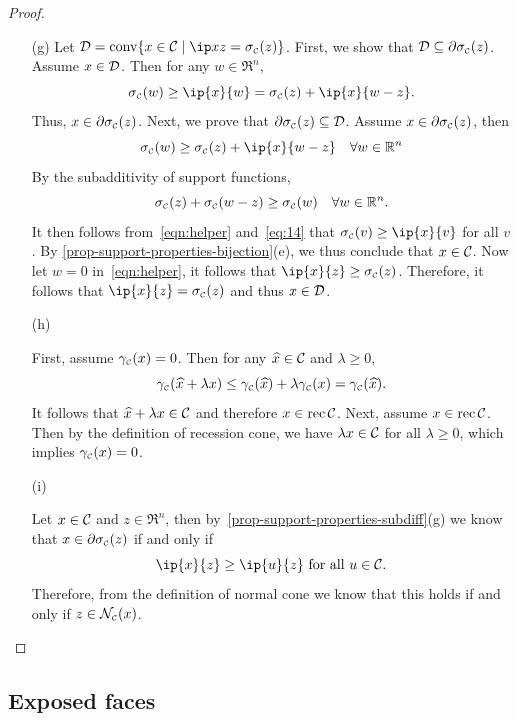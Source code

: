 \begin{proof}
\begin{itemize}
  \item[(g)] Let $\Dscr = \conv\{x\in\Cscr \mid \ip x z = \sigma\Cs(z)\}$. First, we
      show that $\mathcal{D} \subseteq \partial\sigma_{\scriptscriptstyle\mathcal{C}}(z)$. Assume $x \in \mathcal{D}$. Then
      for any $w \in \Re^n$,
    \[\sigma\Cs(w) \geq \ip{x}{w} = \sigma\Cs(z) + \ip{x}{w - z}.\]
    Thus, $x \in \partial\sigma_{\scriptscriptstyle\mathcal{C}}(z)$. Next, we prove that
    $\partial\sigma_{\scriptscriptstyle\mathcal{C}}(z) \subseteq \mathcal{D}$. Assume
    $x \in \partial\sigma_{\scriptscriptstyle\mathcal{C}}(z)$, then
    \begin{equation}\label{eqn:helper}
      \sigma\Cs(w) \geq \sigma\Cs(z) + \ip{x}{w - z} \quad \forall w \in \Re^n
    \end{equation}
    By the subadditivity of support functions,
    \begin{equation} \label{eq:14}
      \sigma_{\scriptscriptstyle\mathcal{C}}(z) + \sigma_{\scriptscriptstyle\mathcal{C}}(w - z) \geq \sigma_{\scriptscriptstyle\mathcal{C}}(w) \quad \forall w \in \mathbb{R}^n.
    \end{equation}
    It then follows from~\eqref{eqn:helper} and~\eqref{eq:14} that
    $\sigma\Cs(v) \geq \ip{x}{v}$ for all $v$.  By \autoref{prop-support-properties-bijection}(e), we thus
    conclude that $x \in \mathcal{C}$. Now let $w = 0$ in~\eqref{eqn:helper},
    it follows that $\ip{x}{z} \geq \sigma\Cs(z)$.  Therefore, it
    follows that $\ip{x}{z} = \sigma\Cs(z)$ and thus $x \in \mathcal{D}$.
  
  \item[(h)]
  
    First, assume $\gamma_{\scriptscriptstyle\mathcal{C}}(x) = 0$. Then for any $\xhat \in \Cscr$ and
    $\lambda \geq 0$,
    \[
      \gauge\Cs(\xhat + \lambda x) \leq \gauge\Cs(\xhat) +
      \lambda\gauge\Cs(x) = \gauge\Cs(\xhat).
    \]
    It follows that $\xhat + \lambda x \in \Cscr$ and therefore
    $x\in\operatorname{rec}\mathcal{C}$. Next, assume $x\in\operatorname{rec}\mathcal{C}$. Then by the
    definition of recession cone, we have $\lambda x \in \mathcal{C}$ for all
    $\lambda \geq 0$, which implies $\gamma_{\scriptscriptstyle\mathcal{C}}(x) = 0$.
  
  \item[(i)] 
  
    Let $x\in\mathcal{C}$ and $z\in\Re^n$, then by~\autoref{prop-support-properties-subdiff}(g) we know that $x\in\partial\sigma_{\scriptscriptstyle\mathcal{C}}(z)$ if and only if 
    \[\ip{x}{z} \geq \ip{u}{z} \mbox{ for all } u \in \Cscr.\]
    Therefore, from the definition of normal cone we know that this holds if and only if $z \in \mathcal{N}_{\scriptscriptstyle\mathcal{C}}(x)$.
  \end{itemize}	
  \end{proof}

\subsection{Exposed faces} \label{sec:exposed-faces}

